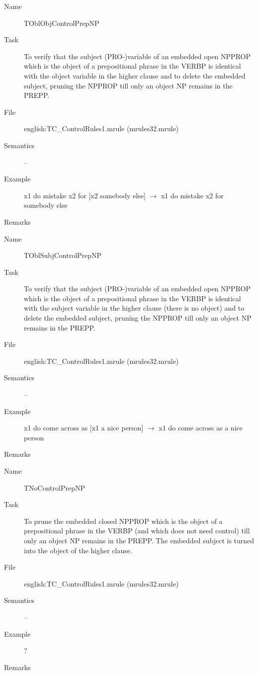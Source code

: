 \begin{description}
\vspace{1 cm}
\begin{description}
\item[Name]   TOblObjControlPrepNP
\item[Task] To verify that  the subject (PRO-)variable of an embedded 
open NPPROP which is the object of a 
prepositional phrase in the VERBP is identical with the object variable in the 
higher clause 
and to delete the embedded subject, pruning the NPPROP till only an object NP
remains in the PREPP. 
\item[File] english:TC\_ControlRules1.mrule (mrules32.mrule)
\item[Semantics] --
\item[Example] x1 do mistake x2 for [x2 somebody else] $\rightarrow$ x1 do 
mistake x2 for somebody else
\item[Remarks] 
\end{description}

\vspace{1 cm}
\begin{description}
\item[Name] TOblSubjControlPrepNP
\item[Task] To verify that  the subject (PRO-)variable of an embedded 
open NPPROP which is the object of a prepositional phrase in the VERBP is 
identical with the subject variable in the higher clause (there is no object)
and to delete the embedded subject, pruning the NPPROP till only an object NP
remains in the PREPP. 
\item[File] english:TC\_ControlRules1.mrule (mrules32.mrule)
\item[Semantics] --
\item[Example] x1 do come across as [x1 a nice person] $\rightarrow$ x1 do come 
across as a nice person
\item[Remarks] 
\end{description}

\vspace{1 cm}
\begin{description}
\item[Name]   TNoControlPrepNP
\item[Task] To prune the embedded closed NPPROP which is the object of a 
prepositional phrase in the VERBP (and which does not need control) 
till only an object NP remains in the PREPP. The embedded subject is turned 
into the object of the higher clause.
\item[File] english:TC\_ControlRules1.mrule (mrules32.mrule)
\item[Semantics] --
\item[Example] ?
\item[Remarks] 
\end{description}


\end{description}
